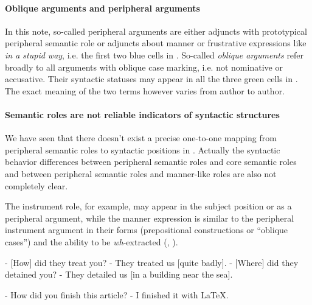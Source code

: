 \documentclass[UTF8, a4paper, oneside, scheme=plain, 12pt]{ctexbook}
\newcommand*{\term}[1]{\emph{#1}}
\newcommand{\form}[1]{\emph{#1}}
\begin{document}
\paragraph*{Oblique arguments and peripheral arguments}

In this note, so-called peripheral arguments
are either adjuncts with prototypical peripheral semantic role
or adjuncts about manner or frustrative expressions like \form{in a stupid way},
i.e. the first two blue cells in .
So-called \term{oblique arguments}
refer broadly to all arguments with oblique case marking, i.e. not nominative or accusative.
Their syntactic statuses may appear in 
all the three green cells in .
The exact meaning of the two terms however varies from author to author. 

\paragraph*{Semantic roles are not reliable indicators of syntactic structures}
We have seen that there doesn't exist a precise one-to-one mapping 
from peripheral semantic roles to syntactic positions in .
Actually the syntactic behavior differences between peripheral semantic roles and core semantic roles
and between peripheral semantic roles and manner-like roles 
are also not completely clear.

The instrument role, for example, 
may appear in the subject position or as a peripheral argument, 
while the manner expression is similar to the peripheral instrument argument 
in their forms (prepositional constructions or ``oblique cases'')
and the ability to be \form{wh}-extracted
(, ).

\begin{exe}
    \ex\label{ex:simple-clause.dependents.ex-1} - [How] did they treat you? - They treated us [quite badly].
    \ex\label{ex:simple-clause.dependents.ex-2} - [Where] did they detained you? - They detailed us [in a building near the sea].
\end{exe}

\begin{exe}
    \ex\label{ex:simple-clause.dependents.ex-3} - How did you finish this article? 
    - I finished it with LaTeX.
\end{exe}
\end{document}
